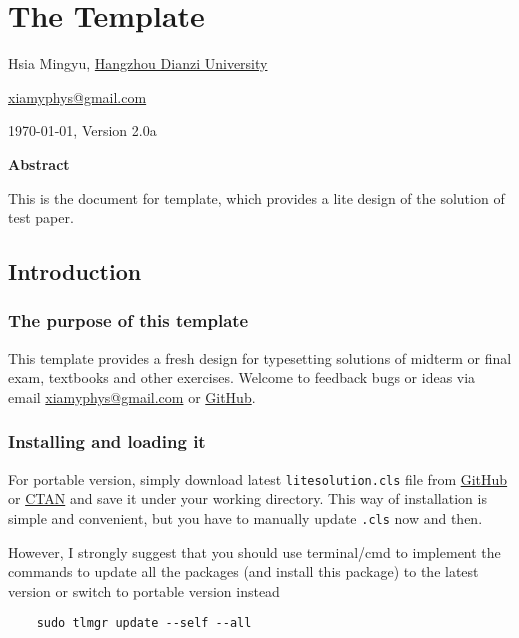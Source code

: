 \documentclass[ans]{litesolution}
\newenvironment{abstract}
    {\small\setstretch{2}\begin{center}\textbf{Abstract}\par}{\end{center}}
\begin{document}
\chapter{The  Template}

\begin{center}
    Hsia Mingyu, \href{https://www.hdu.edu.cn}{Hangzhou Dianzi University}

    \href{mailto:xiamyphys@gmail.com}{\ttfamily xiamyphys@gmail.com}

    \today, Version 2.0a
\end{center}

\begin{abstract}
    This is the document for  template, which provides a lite design of the solution of test paper.
\end{abstract}

\section{Introduction}
\subsection{The purpose of this template}
This template provides a fresh design for typesetting solutions of midterm or final exam, textbooks and other exercises. Welcome to feedback bugs or ideas via email \href{mailto:xiamyphys@gmail.com}{\ttfamily xiamyphys@gmail.com} or \href{https://github.com/xiamyphys/litesolution}{GitHub}.

\subsection{Installing  and loading it}
For portable version, simply download latest \verb|litesolution.cls| file from \href{https://github.com/xiamyphys/LiteSolution}{GitHub} or \href{https://ctan.org/pkg/litesolution}{CTAN} and save it under your working directory. This way of installation is simple and convenient, but you have to manually update \verb|.cls| now and then.

However, I strongly suggest that you should use terminal/cmd to implement the commands to update all the packages (and install this package) to the latest version or switch to portable version instead
\begin{verbatim}
    sudo tlmgr update --self --all
\end{verbatim}
\end{document}
